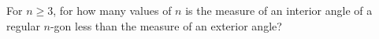 For $n\ge3$, for how many values of $n$ is the measure of an interior angle of a regular $n$-gon less than the measure of an exterior angle?
